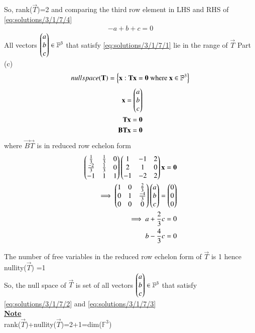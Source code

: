 So, rank($\vec{T}$)=2 and comparing the third row element in LHS and RHS of \eqref{eq:solutions/3/1/7/4}
\begin{align}
  -a+b+c=0 \label{eq:solutions/3/1/7/1} 
\end{align}
All vectors $\begin{pmatrix}a\\b\\c\end{pmatrix} \in \mathbb{F}^3$ that satisfy \eqref{eq:solutions/3/1/7/1} lie in the range of $\vec{T}$
{Part (c)}
\begin{align}
nullspace(\mathbf{T})=\left\{\mathbf{x} :\mathbf{T}\mathbf{x}=\mathbf{0} \text{  where  } \mathbf{x} \in \mathbb{F}^3\right\}
\end{align}
\begin{align}
\mathbf{x}=\begin{pmatrix}a\\b\\c\end{pmatrix}\\
    \mathbf{T}\mathbf{x}=\mathbf{0}\\
    \mathbf{B}\mathbf{T}\mathbf{x}=\mathbf{0}
    \end{align}
    where $ \vec{B}\vec{T}$ is in reduced row echelon form
    \begin{align}
     \begin{pmatrix}\frac{1}{3}&\frac{1}{3}&0\\\frac{-2}{3}&\frac{1}{3}&0\\-1&1&1\end{pmatrix}\begin{pmatrix}1&-1&2\\2&1&0\\-1&-2&2\end{pmatrix}\mathbf{x}=\mathbf{0}\\
     \implies  \begin{pmatrix}1&0&\frac{2}{3}\\0&1&\frac{-4}{3}\\0&0&0\end{pmatrix}\begin{pmatrix}a\\b\\c\end{pmatrix}=\begin{pmatrix}0\\0\\0\end{pmatrix}
    \\\implies a+\frac{2}{3}c=0\label{eq:solutions/3/1/7/2}\\b-\frac{4}{3}c=0\label{eq:solutions/3/1/7/3}
    \end{align}
    
The number of free variables in the reduced row echelon form of $\vec{T}$ is 1 hence nullity($\vec{T}$) =1\\
So, the null space of $\vec{T}$ is set of all vectors $\begin{pmatrix}a\\b\\c\end{pmatrix} \in \mathbb{F}^3$ that satisfy \eqref{eq:solutions/3/1/7/2} and \eqref{eq:solutions/3/1/7/3}\\
\underline{\textbf{Note}}\\
rank($\vec{T}$)+nullity($\vec{T}$)=2+1=dim($ \mathbb{F}^3$)


